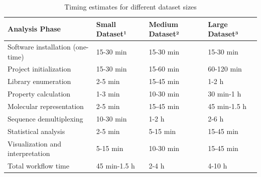 \begin{table}[htbp]
\centering
\caption{Timing estimates for different dataset sizes}
\label{tab:table14}
\begin{tabular}{llll}
\toprule
Analysis Phase & Small Dataset¹ & Medium Dataset² & Large Dataset³ \\
\midrule
Software installation (one-time) & 15-30 min & 15-30 min & 15-30 min \\
Project initialization & 15-30 min & 15-60 min & 60-120 min \\
Library enumeration & 2-5 min & 15-45 min & 1-2 h \\
Property calculation & 1-3 min & 10-30 min & 30 min-1 h \\
Molecular representation & 2-5 min & 15-45 min & 45 min-1.5 h \\
Sequence demultiplexing & 10-30 min & 1-2 h & 2-6 h \\
Statistical analysis & 2-5 min & 5-15 min & 15-45 min \\
Visualization and interpretation & 5-15 min & 10-30 min & 15-45 min \\
Total workflow time & 45 min-1.5 h & 2-4 h & 4-10 h \\
\bottomrule
\end{tabular}
\end{table}